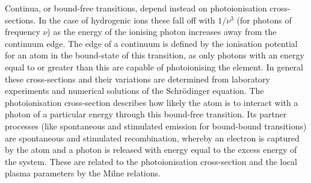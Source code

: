 Continua, or bound-free transitions, depend instead on photoionisation cross-sections.
In the case of hydrogenic ions these fall off with $1/\nu^3$ (for photons of frequency $\nu$) as the energy of the ionising photon increases away from the continuum edge.
The edge of a continuum is defined by the ionisation potential for an atom in the bound-state of this transition, as only photons with an energy equal to or greater than this are capable of photoionising the element.
In general these cross-sections and their variations are determined from laboratory experiments and numerical solutions of the Schr\"{o}dinger equation.
The photoionisation cross-section describes how likely the atom is to interact with a photon of a particular energy through this bound-free transition.
Its partner processes (like spontaneous and stimulated emission for bound-bound transitions) are spontaneous and stimulated recombination, whereby an electron is captured by the atom and a photon is released with energy equal to the excess energy of the system.
These are related to the photoionisation cross-section and the local plasma parameters by the Milne relations.

